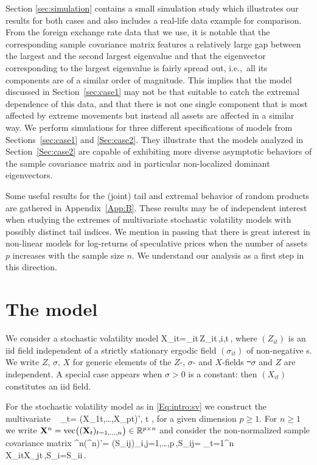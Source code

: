 Section \ref{sec:simulation} contains a small simulation study which
illustrates our results for both cases and also includes a real-life
data example for comparison. From the foreign exchange rate data that
we use, it is notable that the corresponding sample covariance matrix
features a relatively large gap between the largest and the second
largest eigenvalue and that the eigenvector corresponding to the
largest eigenvalue is fairly spread out, i.e.,\ all its components are
of a similar order of magnitude. This implies that the model discussed
in Section~\ref{sec:case1} may not be that suitable to catch the
extremal dependence of this data, and that there is not one single
component that is most affected by extreme movements but instead all
assets are affected in a similar way. We perform simulations for three
different specifications of models from Sections~\ref{sec:case1} and
\ref{Sec:case2}. They illustrate that the models analyzed 
in Section~\ref{Sec:case2} are capable of exhibiting more diverse
asymptotic behaviors of the sample covariance matrix and in particular
non-localized dominant eigenvectors.

Some useful results for the (joint) tail and extremal behavior of
random products are gathered in Appendix~\ref{App:B}.
These results may be of independent interest when studying the
extremes of multivariate stochastic volatility models with possibly
distinct tail indices. We mention in passing that there is great
interest in non-linear models for log-returns of speculative prices
when the number of assets $p$ increases with the sample size $n$. We
understand our analysis as a first step in this direction. 



\section{The model}\label{sec:model:anja}
We consider a stochastic volatility model
\beam\label{eq:1a:anja}
X_{it}=\sigma_{it}\,Z_{it}\,,\qquad i,t\in\bbz\,,
\eeam
where $(Z_{it})$ is an iid field independent of a strictly stationary
ergodic field $(\sigma_{it})$ of non-negative \rv s.
We write $Z$, $\sigma$, $X$ for generic elements of the $Z$-,
$\sigma$- and $X$-fields \st\ $\sigma$ and $Z$ are independent.
A special case appears when $\sigma>0$ is a constant: then $(X_{it})$ constitutes an iid field. 

For the stochastic volatility model as in \eqref{Eq:intro:sv} we construct the 
multivariate \ts\ 
\beam\label{eq:multvts}
 \bfX_t= (X_{1t},\ldots,X_{pt})', \;\;\; t \in {},
\eeam 
for a given dimension $p\ge 1$. For $n\geq 1$ we write ${\bf X}^n={\rm
  vec}\big(({\bf X}_t)_{t=1, \ldots, n}\big) \in \mathbb{R}^{p \times n}$
and consider the non-normalized sample covariance matrix
\beam\label{eq:esses}
\bfX^n(\bfX^n)'= (S_{ij})_{i,j=1,\ldots,p}\,,\qquad S_{ij}=
\sum_{t=1}^n X_{it}X_{jt}\,,\qquad S_i=S_{ii}\,.
\eeam

